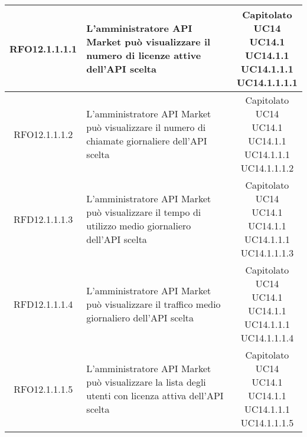 \begin{longtable}{|c|p{8cm}|c|}
\hypertarget{RFO12.1.1.1.1}{RFO12.1.1.1.1} & L'amministratore API Market può visualizzare il numero di licenze attive dell'API scelta & \makecell*{Capitolato\\UC14\\UC14.1\\UC14.1.1\\UC14.1.1.1\\UC14.1.1.1.1} \\
\hline
\hypertarget{RFO12.1.1.1.2}{RFO12.1.1.1.2} & L'amministratore API Market può visualizzare il numero di chiamate giornaliere dell'API scelta & \makecell*{Capitolato\\UC14\\UC14.1\\UC14.1.1\\UC14.1.1.1\\UC14.1.1.1.2} \\
\hline
\hypertarget{RFD12.1.1.1.3}{RFD12.1.1.1.3} & L'amministratore API Market può visualizzare il tempo di utilizzo medio giornaliero dell'API scelta & \makecell*{Capitolato\\UC14\\UC14.1\\UC14.1.1\\UC14.1.1.1\\UC14.1.1.1.3} \\
\hline
\hypertarget{RFD12.1.1.1.4}{RFD12.1.1.1.4} & L'amministratore API Market può visualizzare il traffico medio giornaliero dell'API scelta & \makecell*{Capitolato\\UC14\\UC14.1\\UC14.1.1\\UC14.1.1.1\\UC14.1.1.1.4} \\
\hline

\hypertarget{RFO12.1.1.1.5}{RFO12.1.1.1.5} & L'amministratore API Market può visualizzare la lista degli utenti con licenza attiva dell'API scelta & \makecell*{Capitolato\\UC14\\UC14.1\\UC14.1.1\\UC14.1.1.1\\UC14.1.1.1.5} \\
\hline


\end{longtable}
